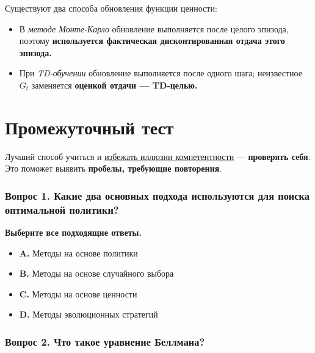 \documentclass[11pt,a4paper]{article}
\begin{document}
Существуют два способа обновления функции ценности:

\begin{itemize}
\tightlist
\item
  В \emph{методе Монте-Карло} обновление выполняется после целого эпизода, поэтому \textbf{используется фактическая дисконтированная отдача этого эпизода.}
\item
  При \emph{TD-обучении} обновление выполняется после одного шага; неизвестное \(G_t\) заменяется \textbf{оценкой отдачи --- TD-целью.}
\end{itemize}


\section{Промежуточный тест}\label{mid-way-quiz}

Лучший способ учиться и \href{https://www.coursera.org/lecture/learning-how-to-learn/illusions-of-competence-BuFzf}{избежать иллюзии компетентности} --- \textbf{проверять себя}. Это поможет выявить \textbf{пробелы, требующие повторения}.

\subsubsection{Вопрос 1. Какие два основных подхода используются для поиска оптимальной политики?}\label{q1-what-are-the-two-main-approaches-to-find-optimal-policy}

\textbf{Выберите все подходящие ответы.}

\begin{itemize}
\tightlist
\item
  \textbf{A.} Методы на основе политики
\item
  \textbf{B.} Методы на основе случайного выбора
\item
  \textbf{C.} Методы на основе ценности
\item
  \textbf{D.} Методы эволюционных стратегий
\end{itemize}

\subsubsection{Вопрос 2. Что такое уравнение Беллмана?}\label{q2-what-is-the-bellman-equation}
\end{document}
